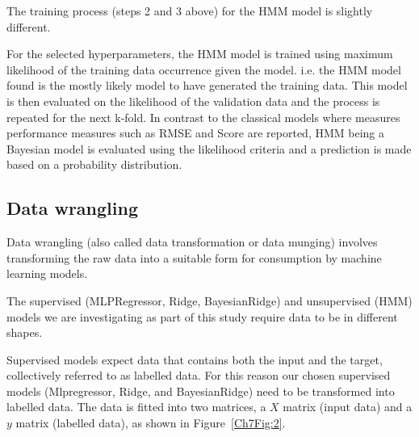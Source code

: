 The training process (steps 2 and 3 above) for the HMM model is slightly different.

For the selected hyperparameters, the HMM model is trained using maximum likelihood of the training data occurrence given the model. i.e. the HMM model found is the mostly likely model to have generated the training data. This model is then evaluated on the likelihood of the validation data and the process is repeated for the next k-fold. In contrast to the classical models where measures performance measures such as RMSE and Score are reported, HMM being a Bayesian model is evaluated using the likelihood criteria and a prediction is made based on a probability distribution.

\subsection{Data wrangling}


Data wrangling (also called data transformation or data munging) involves transforming the raw data into a suitable form for consumption by machine learning models.

The supervised (MLPRegressor, Ridge, BayesianRidge) and unsupervised (HMM) models we are investigating as part of this study require data to be in different shapes.

Supervised models expect data that contains both the input and the target, collectively referred to as labelled data. For this reason our chosen supervised models (Mlpregressor, Ridge, and BayesianRidge) need to be transformed into labelled data. The data is fitted into two matrices, a $X$ matrix (input data) and a $y$ matrix (labelled data), as shown in Figure~\ref{Ch7Fig:2}.

